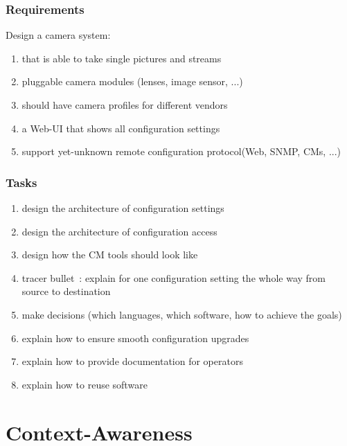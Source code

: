 \begin{frame}
	\frametitle{Requirements}

	Design a camera system:

	\begin{enumerate}
	\item that is able to take single pictures and streams
	\item pluggable camera modules (lenses, image sensor, ...)
	\item should have camera profiles for different vendors
	\item a Web-UI that shows all configuration settings
	\item support yet-unknown remote configuration protocol\linebreak(Web, SNMP, CMs, ...)
	\end{enumerate}
\end{frame}

\begin{frame}
	\frametitle{Tasks}

	\begin{enumerate}
	\item design the architecture of configuration settings
	\item design the architecture of configuration access
	\item design how the CM tools should look like
	\item tracer bullet~\cite{hunt1999pragmatic}: explain for one configuration setting the whole way from source to destination
	\item make decisions (which languages, which software, how to achieve the goals)
	\item explain how to ensure smooth configuration upgrades
	\item explain how to provide documentation for operators
	\item explain how to reuse software
	\end{enumerate}
\end{frame}








\section{Context-Awareness}

\subsection{}

